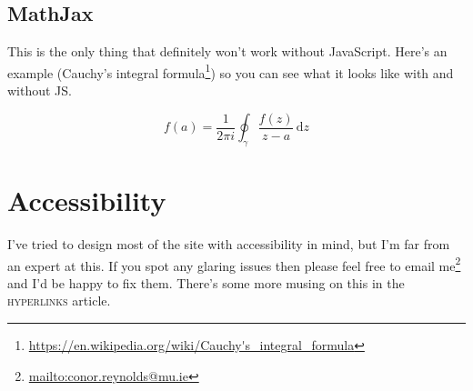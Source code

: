 \documentclass[a4paper,11pt,oneside,article]{memoir}
\begin{document}
\section{MathJax}

This is the only thing that definitely won't work without JavaScript. Here's an example (Cauchy's integral formula\footnote{\url{https://en.wikipedia.org/wiki/Cauchy's_integral_formula}}) so you can see what it looks like with and without JS.

\begin{equation*}
  f(a) = \frac{1}{2 \pi i} \oint_{\gamma} \frac{f(z)}{z - a}\, \mathrm{d}z
\end{equation*}

\chapter[Accessibility]{Accessibility}

I've tried to design most of the site with accessibility in mind, but I'm far from an expert at this. If you spot any glaring issues then please feel free to email me\footnote{\url{mailto:conor.reynolds@mu.ie}} and I'd be happy to fix them. There's some more musing on this in the \textsc{hyperlinks} article.

\printpagenotes
\printbibliography
\end{document}
